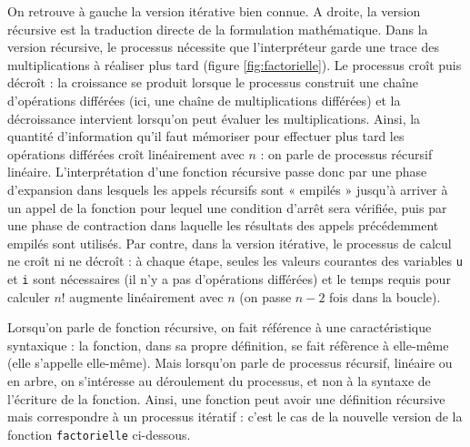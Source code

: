 \noindent On retrouve à gauche la version itérative bien connue. 
A droite, la version récursive est la traduction directe
de la formulation mathématique. Dans la version récursive,
le processus nécessite que l'interpréteur garde une trace des multiplications
à réaliser plus tard (figure \ref{fig:factorielle}). Le processus croît
puis décroît : la croissance se produit lorsque le processus construit une chaîne
d'opérations différées (ici, une chaîne de multiplications différées) et 
la décroissance intervient lorsqu'on peut évaluer les multiplications.
Ainsi, la quantité d'information qu'il faut mémoriser pour effectuer plus tard
les opérations différées croît linéairement avec $n$ : on parle de processus
récursif linéaire. 
L'interprétation d'une fonction récursive passe donc par une phase 
d'expansion dans lesquels les appels récursifs sont « empilés » jusqu'à 
arriver à un appel de la fonction pour lequel une condition d'arrêt sera 
vérifiée, puis par une phase de contraction dans laquelle les résultats 
des appels précédemment empilés sont utilisés.
Par contre, dans la version itérative, le processus de calcul ne croît ni
ne décroît : à chaque étape, seules les valeurs courantes des variables 
{\tt u} et {\tt i} sont nécessaires (il n'y a pas d'opérations différées)
et le temps requis pour calculer $n!$ augmente linéairement avec $n$
(on passe $n-2$ fois dans la boucle).

Lorsqu'on parle de fonction récursive, on fait référence à une
caractéristique syntaxique : la fonction, dans sa propre définition,
se fait réfèrence à elle-même (elle s'appelle elle-même). 
Mais lorsqu'on parle de processus récursif, linéaire ou en arbre, 
on s'intéresse au déroulement du processus, et non à la syntaxe de 
l'écriture de la fonction. 
Ainsi, une fonction peut avoir une définition récursive mais correspondre à
un processus itératif : c'est le cas de la nouvelle version de la fonction 
{\tt factorielle} ci-dessous.

